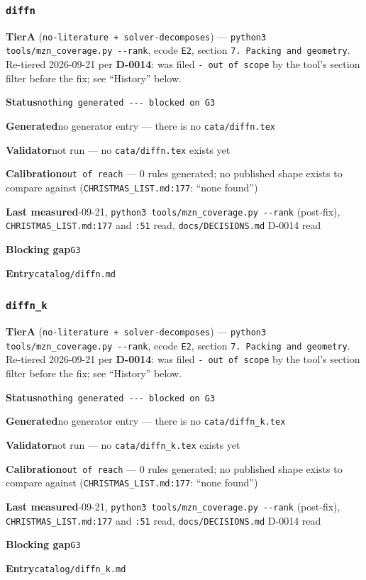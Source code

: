 \documentclass[10pt,a4paper]{article}
\newcommand{\entryfield}[2]{{\raggedright\textbf{#1}\quad #2\par}}
\begin{document}
\subsubsection*{\texttt{diffn}}
\label{entry:diffn}
\entryfield{Tier}{\textbf{A} (\texttt{no-\allowbreak{}literature + solver-\allowbreak{}decomposes}) --- \texttt{python3 tools/\allowbreak{}mzn\_\allowbreak{}coverage.\allowbreak{}py -\allowbreak{}-\allowbreak{}rank}, ecode \texttt{E2}, section \texttt{7. Packing and geometry}. Re-tiered 2026-09-21 per \textbf{D-0014}: was filed \texttt{- out of scope} by the tool's section filter before the fix; see ``History'' below.}
\entryfield{Status}{\texttt{nothing generated -\allowbreak{}-\allowbreak{}-\allowbreak{} blocked on G3}}
\entryfield{Generated}{no generator entry --- there is no \texttt{cata/diffn.tex}}
\entryfield{Validator}{not run --- no \texttt{cata/diffn.tex} exists yet}
\entryfield{Calibration}{\texttt{out of reach} --- 0 rules generated; no published shape exists to compare against (\texttt{CHRISTMAS\_LIST.md:177}: ``none found'')}
\entryfield{Last measured}{2026-09-21, \texttt{python3 tools/\allowbreak{}mzn\_\allowbreak{}coverage.\allowbreak{}py -\allowbreak{}-\allowbreak{}rank} (post-fix), \texttt{CHRISTMAS\_LIST.md:177} and \texttt{:51} read, \texttt{docs/DECISIONS.md} D-0014 read}
\entryfield{Blocking gap}{\texttt{G3}}
\entryfield{Entry}{\texttt{catalog/diffn.md}}
\subsubsection*{\texttt{diffn\_\allowbreak{}k}}
\label{entry:diffn-k}
\entryfield{Tier}{\textbf{A} (\texttt{no-\allowbreak{}literature + solver-\allowbreak{}decomposes}) --- \texttt{python3 tools/\allowbreak{}mzn\_\allowbreak{}coverage.\allowbreak{}py -\allowbreak{}-\allowbreak{}rank}, ecode \texttt{E2}, section \texttt{7. Packing and geometry}. Re-tiered 2026-09-21 per \textbf{D-0014}: was filed \texttt{- out of scope} by the tool's section filter before the fix; see ``History'' below.}
\entryfield{Status}{\texttt{nothing generated -\allowbreak{}-\allowbreak{}-\allowbreak{} blocked on G3}}
\entryfield{Generated}{no generator entry --- there is no \texttt{cata/diffn\_k.tex}}
\entryfield{Validator}{not run --- no \texttt{cata/diffn\_k.tex} exists yet}
\entryfield{Calibration}{\texttt{out of reach} --- 0 rules generated; no published shape exists to compare against (\texttt{CHRISTMAS\_LIST.md:177}: ``none found'')}
\entryfield{Last measured}{2026-09-21, \texttt{python3 tools/\allowbreak{}mzn\_\allowbreak{}coverage.\allowbreak{}py -\allowbreak{}-\allowbreak{}rank} (post-fix), \texttt{CHRISTMAS\_LIST.md:177} and \texttt{:51} read, \texttt{docs/DECISIONS.md} D-0014 read}
\entryfield{Blocking gap}{\texttt{G3}}
\entryfield{Entry}{\texttt{catalog/diffn\_k.md}}
\end{document}
